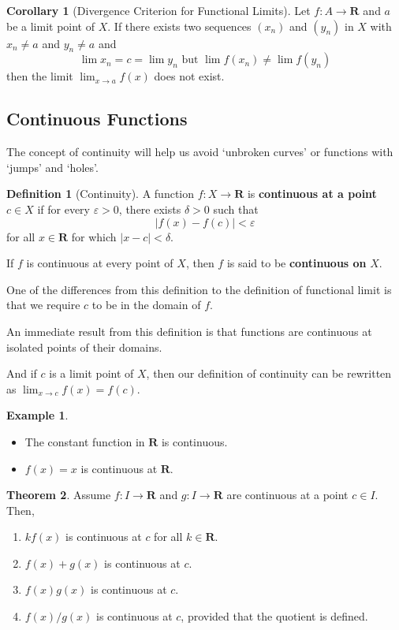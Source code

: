 \documentclass[12pt,a4paper]{article}
\theoremstyle{definition}
\newtheorem{theorem}{Theorem}[section]
\newtheorem{corollary}[theorem]{Corollary}
\newtheorem{example}{Example}[section]
\newtheorem{definition}{Definition}[section]
\begin{document}
\begin{corollary}[Divergence Criterion for Functional Limits]
	Let $f : A \longrightarrow \textbf{R}$ and $a$ be a limit point of $X$. If there exists two sequences $(x_n)$ and $(y_n)$ in $X$ with $x_n \neq a$ and $y_n \neq a$ and
	\[
		\lim x_n = c = \lim y_n \text{ but } \lim f(x_n) \neq \lim f(y_n)
	\]
	then the limit $ \lim_{x \to a} f(x)$ does not exist.
\end{corollary}

\subsection{Continuous Functions}

The concept of continuity will help us avoid `unbroken curves' or functions with `jumps' and `holes'.

\begin{definition}[Continuity]
	A function $f : X \longrightarrow \textbf{R}$ is \textbf{continuous at a point} $c \in X$ if for every $\varepsilon > 0$, there exists $\delta > 0$ such that
	\[
		| f(x) - f(c) | < \varepsilon
	\]
	for all $x \in \textbf{R}$ for which $| x - c | < \delta$.
	
	If $f$ is continuous at every point of $X$, then $f$ is said to be \textbf{continuous on} $X$.
\end{definition}

One of the differences from this definition to the definition of functional limit is that we require $c$ to be in the domain of $f$.

An immediate result from this definition is that functions are continuous at isolated points of their domains.

And if $c$ is a limit point of $X$, then our definition of continuity can be rewritten as $\lim_{x \to c} f(x) = f(c)$.

\begin{example}
\begin{itemize} \hfill
	\item The constant function in $\textbf{R}$ is continuous.
	\item $f(x) = x$ is continuous at $\textbf{R}$.
\end{itemize}
\end{example}

\begin{theorem}
	Assume $f : I \longrightarrow \textbf{R}$ and $g : I \longrightarrow \textbf{R}$ are continuous at a point $c \in I$. Then,
	
	\begin{enumerate}
		\item $k f(x)$ is continuous at $c$ for all $k \in \textbf{R}$.
		\item $f(x) + g(x)$	is continuous at $c$.
		\item $f(x)g(x)$ is continuous at $c$.
		\item $f(x)/g(x)$ is continuous at $c$, provided that the quotient is defined.
	\end{enumerate}
\end{theorem}
\end{document}
